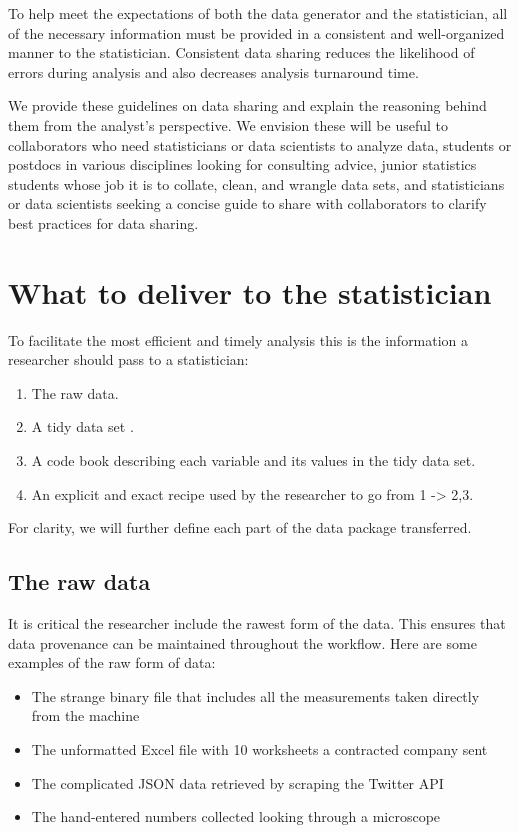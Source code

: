 \documentclass[12pt]{article}
\providecommand{\tightlist}{%
  \setlength{\itemsep}{0pt}\setlength{\parskip}{0pt}}
\begin{document}
To help meet the expectations of both the data generator and the
statistician, all of the necessary information must be provided in a
consistent and well-organized manner to the statistician. Consistent
data sharing reduces the likelihood of errors during analysis and also
decreases analysis turnaround time.

We provide these guidelines on data sharing and explain the reasoning
behind them from the analyst's perspective. We envision these will be
useful to collaborators who need statisticians or data scientists to
analyze data, students or postdocs in various disciplines looking for
consulting advice, junior statistics students whose job it is to
collate, clean, and wrangle data sets, and statisticians or data
scientists seeking a concise guide to share with collaborators to
clarify best practices for data sharing.

\section{What to deliver to the
statistician}\label{what-to-deliver-to-the-statistician}

To facilitate the most efficient and timely analysis this is the
information a researcher should pass to a statistician:

\begin{enumerate}
\def\labelenumi{\arabic{enumi}.}
\tightlist
\item
  The raw data.
\item
  A tidy data set \citep{_tidy_data}.
\item
  A code book describing each variable and its values in the tidy data
  set.
\item
  An explicit and exact recipe used by the researcher to go from 1
  -\textgreater{} 2,3.
\end{enumerate}

For clarity, we will further define each part of the data package
transferred.

\subsection{The raw data}\label{the-raw-data}

It is critical the researcher include the rawest form of the data. This
ensures that data provenance can be maintained throughout the workflow.
Here are some examples of the raw form of data:

\begin{itemize}
\tightlist
\item
  The strange binary file \citep{_binary_2017} that includes all the
  measurements taken directly from the machine
\item
  The unformatted Excel file with 10 worksheets a contracted company
  sent
\item
  The complicated JSON \citep{noauthor_json:_nodate} data retrieved by
  scraping the Twitter API
\item
  The hand-entered numbers collected looking through a microscope
\end{itemize}
\end{document}

